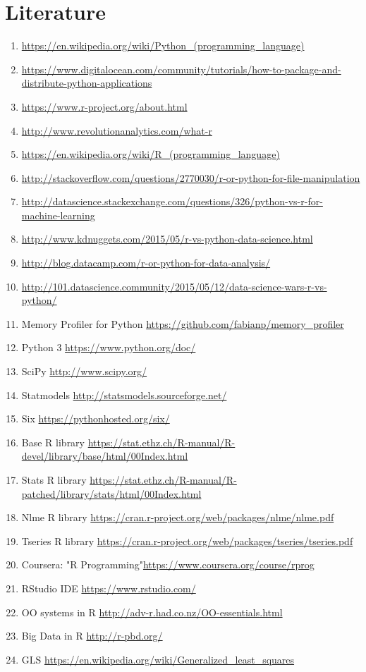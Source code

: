 \documentclass[
  twoside,
  12pt, a4paper,
  footinclude=true,
  headinclude=true,
  cleardoublepage=empty
]{article}
\begin{document}
\section{Literature}
\begin{enumerate}
    \item \url{https://en.wikipedia.org/wiki/Python_(programming_language)}
    \item \url{https://www.digitalocean.com/community/tutorials/how-to-package-and-distribute-python-applications}
    \item \url{https://www.r-project.org/about.html}
    \item \url{http://www.revolutionanalytics.com/what-r}
    \item \url{https://en.wikipedia.org/wiki/R_(programming_language)}
    \item \url{http://stackoverflow.com/questions/2770030/r-or-python-for-file-manipulation}
    \item \url{http://datascience.stackexchange.com/questions/326/python-vs-r-for-machine-learning}
    \item \url{http://www.kdnuggets.com/2015/05/r-vs-python-data-science.html}
    \item \url{http://blog.datacamp.com/r-or-python-for-data-analysis/}
    \item \url{http://101.datascience.community/2015/05/12/data-science-wars-r-vs-python/}
    \item Memory Profiler for Python \url{https://github.com/fabianp/memory_profiler} 
    \item Python 3 \url{https://www.python.org/doc/}
    \item SciPy \url{http://www.scipy.org/}
    \item Statmodels \url{http://statsmodels.sourceforge.net/}
    \item Six \url{https://pythonhosted.org/six/}
    \item Base R library \url{https://stat.ethz.ch/R-manual/R-devel/library/base/html/00Index.html}
    \item Stats R library \url{https://stat.ethz.ch/R-manual/R-patched/library/stats/html/00Index.html}
    \item Nlme R library \url{https://cran.r-project.org/web/packages/nlme/nlme.pdf}
    \item Tseries R library \url{https://cran.r-project.org/web/packages/tseries/tseries.pdf}
    \item Coursera: "R Programming"\url{https://www.coursera.org/course/rprog}
    \item RStudio IDE \url{https://www.rstudio.com/}
    \item OO systems in R \url{http://adv-r.had.co.nz/OO-essentials.html}
    \item Big Data in R \url{http://r-pbd.org/}
    \item GLS \url{https://en.wikipedia.org/wiki/Generalized_least_squares}
\end{enumerate}
\end{document}
